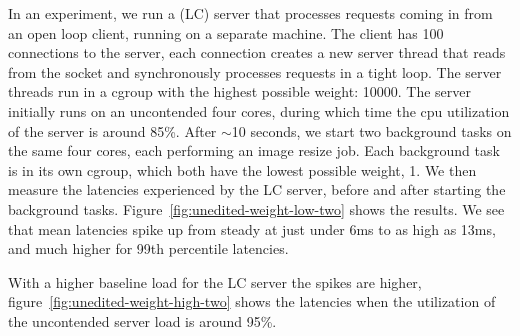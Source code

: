 In an experiment, we run a (LC) server that processes requests coming in from an
open loop client, running on a separate machine. The client has 100 connections
to the server, each connection creates a new server thread that reads from the
socket and synchronously processes requests in a tight loop. The server threads
run in a cgroup with the highest possible weight: 10000. The server initially
runs on an uncontended four cores, during which time the cpu utilization of the
server is around 85\%. After $\sim$10 seconds, we start two background tasks on
the same four cores, each performing an image resize job. Each background task
is in its own cgroup, which both have the lowest possible weight, 1. We then
measure the latencies experienced by the LC server, before and after starting
the background tasks. Figure~\ref{fig:unedited-weight-low-two} shows the
results. We see that mean latencies spike up from steady at just under 6ms to as
high as 13ms, and much higher for 99th percentile latencies.

With a higher baseline load for the LC server the spikes are higher,
figure~\ref{fig:unedited-weight-high-two} shows the latencies when the
utilization of the uncontended server load is around 95\%.
